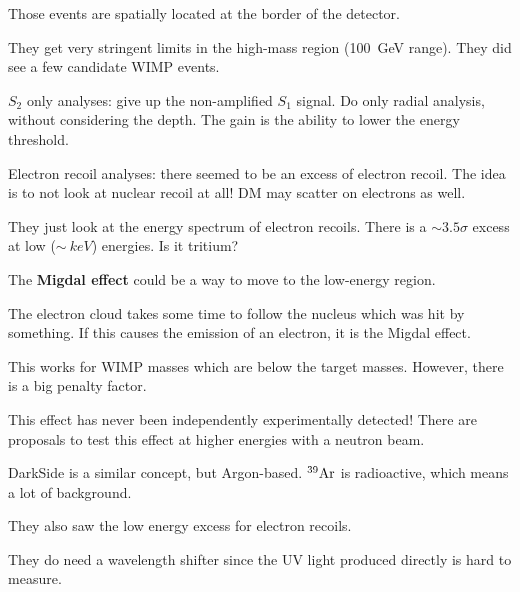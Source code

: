 \documentclass[main.tex]{subfiles}
\begin{document}
Those events are spatially located at the border of the detector. 

They get very stringent limits in the high-mass region (\SI{100}{GeV} range).
They did see a few candidate WIMP events. 

\(S_2 \) only analyses: give up the non-amplified \(S_1 \) signal. 
Do only radial analysis, without considering the depth.
The gain is the ability to lower the energy threshold. 

Electron recoil analyses: there seemed to be an excess of electron recoil. 
The idea is to not look at nuclear recoil at all! 
DM may scatter on electrons as well. 

They just look at the energy spectrum of electron recoils.  
There is a \(\sim 3.5 \sigma \) excess at low (\(\sim \SI{}{keV}\)) energies. Is it tritium? 

The \textbf{Migdal effect} could be a way to move to the low-energy region. 

The electron cloud takes some time to follow the nucleus which was hit by something. 
If this causes the emission of an electron, it is the Migdal effect.

This works for WIMP masses which are below the target masses. 
However, there is a big penalty factor. 

This effect has never been independently experimentally detected! 
There are proposals to test this effect at higher energies with a neutron beam. 


DarkSide is a similar concept, but Argon-based. 
\(^{39} \ce{Ar}\) is radioactive, which means a lot of background. 

They also saw the low energy excess for electron recoils.

They do need a wavelength shifter since the UV light produced directly is hard to measure. 
\end{document}
